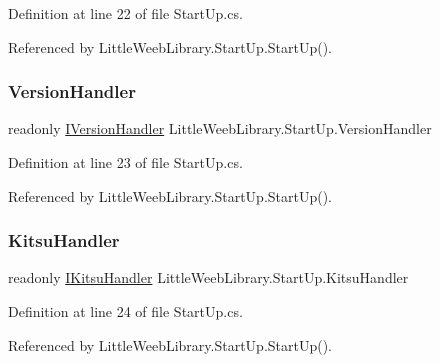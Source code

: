 Definition at line 22 of file Start\+Up.\+cs.



Referenced by Little\+Weeb\+Library.\+Start\+Up.\+Start\+Up().

\mbox{\label{class_little_weeb_library_1_1_start_up_a6d2a07a49ea183721e0c3db070119bc7}} 
\subsubsection{\texorpdfstring{Version\+Handler}{VersionHandler}}
{\footnotesize\ttfamily readonly \mbox{\hyperlink{interface_little_weeb_library_1_1_handlers_1_1_i_version_handler}{I\+Version\+Handler}} Little\+Weeb\+Library.\+Start\+Up.\+Version\+Handler\hspace{0.3cm}{\ttfamily [private]}}



Definition at line 23 of file Start\+Up.\+cs.



Referenced by Little\+Weeb\+Library.\+Start\+Up.\+Start\+Up().

\mbox{\label{class_little_weeb_library_1_1_start_up_a5a49b71bffa630f5a24994a9c5d0482c}} 
\subsubsection{\texorpdfstring{Kitsu\+Handler}{KitsuHandler}}
{\footnotesize\ttfamily readonly \mbox{\hyperlink{interface_little_weeb_library_1_1_handlers_1_1_i_kitsu_handler}{I\+Kitsu\+Handler}} Little\+Weeb\+Library.\+Start\+Up.\+Kitsu\+Handler\hspace{0.3cm}{\ttfamily [private]}}



Definition at line 24 of file Start\+Up.\+cs.



Referenced by Little\+Weeb\+Library.\+Start\+Up.\+Start\+Up().

